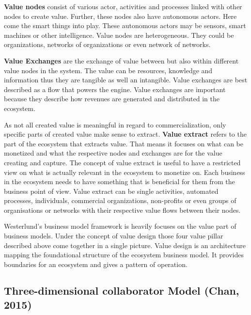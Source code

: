 		\textbf{Value nodes} consist of various actor, activities and processes linked with other nodes to create value. Further, these nodes also have autonomous actors. Here come the smart things into play. These autonomous actors may be sensors, smart machines or other intelligence. Value nodes are heterogeneous. They could be organizations, networks of organizations or even network of networks.

		\textbf{Value Exchanges} are the exchange of value between but also within different value nodes in the system. The value can be resources, knowledge and information thus they are tangible as well an intangible. Value exchanges are best described as a flow that powers the engine. Value exchanges are important because they describe how revenues are generated and distributed in the ecosystem.

		As not all created value is meaningful in regard to commercialization, only specific parts of created value make sense to extract. \textbf{Value extract} refers to the part of the ecosystem that extracts value. That means it focuses on what can be monetized and what the respective nodes and exchanges are for the value creating and capture. The concept of value extract is useful to have a restricted view on what is actually relevant in the ecosystem to monetize on. Each business in the ecosystem needs to have something that is beneficial for them from the business point of view. Value extract can be single activities, automated processes, individuals, commercial organizations, non-profits or even groups of organisations or networks with their respective value flows between their nodes.

		Westerlund's business model framework is heavily focuses on the value part of business models. Under the concept of value design those four value pillar described above come together in a single picture. Value design is an architecture mapping the foundational structure of the ecosystem business model. It provides boundaries for an ecosystem and gives a pattern of operation.

	\subsection{Three-dimensional collaborator Model (Chan, 2015)}



